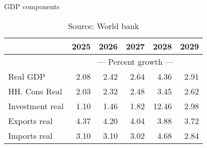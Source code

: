 \documentclass{article}
\begin{document}
\begin{table}[ht]
\caption{GDP components}
\begin{tabular}{lrrrrr}
\toprule
 & 2025 & 2026 & 2027 & 2028 & 2029 \\
\midrule
&\multicolumn{5}{c}{{--- Percent growth ---}}                          \\
Real GDP & 2.08 & 2.42 & 2.64 & 4.36 & 2.91 \\
HH. Cons Real & 2.03 & 2.32 & 2.48 & 3.45 & 2.62 \\
Investment real & 1.10 & 1.46 & 1.82 & 12.46 & 2.98 \\
Exports real & 4.37 & 4.20 & 4.04 & 3.88 & 3.72 \\
Imports real & 3.10 & 3.10 & 3.02 & 4.68 & 2.84 \\
\bottomrule
\end{tabular}
\caption*{Source: World bank }
\end{table}
\end{document}
